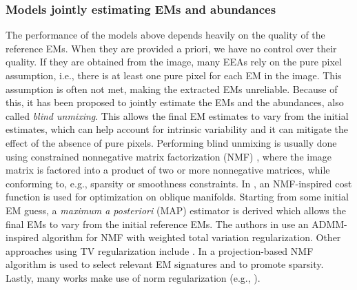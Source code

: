 \subsubsection{Models jointly estimating EMs and abundances}
The performance of the models above depends heavily on the quality of the reference EMs. When they are provided a priori, we have no control over their quality. If they are obtained from the image, many EEAs rely on the pure pixel assumption, i.e., there is at least one pure pixel for each EM in the image. This assumption is often not met, making the extracted EMs unreliable. Because of this, it has been proposed to jointly estimate the EMs and the abundances, also called \textit{blind unmixing}. This allows the final EM estimates to vary from the initial estimates, which can help account for intrinsic variability and it can mitigate the effect of the absence of pure pixels. Performing blind unmixing is usually done using constrained nonnegative matrix factorization (NMF) \cite{lee_learning_1999}, where the image matrix is factored into a product of two or more nonnegative matrices, while conforming to, e.g., sparsity or smoothness constraints. In \cite{drumetz_spectral_2020}, an NMF-inspired cost function is used for optimization on oblique manifolds. Starting from some initial EM guess, a \textit{maximum a posteriori} (MAP) estimator is derived which allows the final EMs to vary from the initial reference EMs. The authors in \cite{song_weighted_2022} use an ADMM-inspired algorithm for NMF with weighted total variation regularization. Other approaches using TV regularization include \cite{qin_blind_2021, he_total_2017}. In \cite{yuan_projection-based_2015} a projection-based NMF algorithm is used to select relevant EM signatures and to promote sparsity. Lastly, many works make use of norm regularization (e.g., \cite{qian_hyperspectral_2011, sigurdsson_hyperspectral_2014, sun_blind_2022}).



